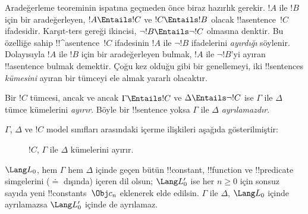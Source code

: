 



Aradeğerleme teoreminin ispatına geçmeden önce biraz hazırlık gerekir.
$!A$ ile $!B$ için bir aradeğerleyen, $!A\Entails !C$ ve
$!C\Entails !B$ olacak !!a{sentence}~$!C$ ifadesidir. Karşıt-ters
gereği ikincisi, $\lnot !B\Entails\lnot !C$ olmasına denktir. Bu
özelliğe sahip !!^a{sentence}~$!C$ ifadesinin $!A$ ile $\lnot !B$
ifadelerini \emph{ayırdığı} söylenir. Dolayısıyla $!A$ ile $!B$ için
bir aradeğerleyen bulmak, $!A$ ile $\lnot !B$'yi ayıran !!a{sentence}
bulmak demektir. Çoğu kez olduğu gibi bir genellemeyi, iki
!!{sentence}s \emph{kümesini} ayıran bir tümceyi ele almak yararlı
olacaktır.

\begin{defn}
Bir $!C$ tümcesi, ancak ve ancak $\Gamma\Entails !C$ ve
$\Delta\Entails\lnot !C$ ise $\Gamma$ ile $\Delta$ tümce kümelerini
\emph{ayırır}. Böyle bir !!{sentence} yoksa $\Gamma$ ile $\Delta$
\emph{ayrılamazdır}.
\end{defn}

$\Gamma$, $\Delta$ ve $!C$ model sınıfları arasındaki içerme ilişkileri
aşağıda gösterilmiştir:
\begin{figure}[h]
  \centering
  \caption{$!C$, $\Gamma$ ile $\Delta$ kümelerini ayırır.}
\end{figure}

\begin{lem}
$\Lang L_0$, hem $\Gamma$ hem $\Delta$ içinde geçen bütün
!!{constant}, !!{function} ve !!{predicate} simgelerini ($\doteq$
dışında) içeren dil olsun; $\Lang L'_0$ ise her $n\geq0$ için sonsuz
sayıda yeni !!{constant}s~$\Obj c_n$ eklenerek elde edilsin. $\Gamma$
ile $\Delta$, $\Lang L_0$ içinde ayrılamazsa $\Lang L'_0$ içinde de
ayrılamaz.
\end{lem}

